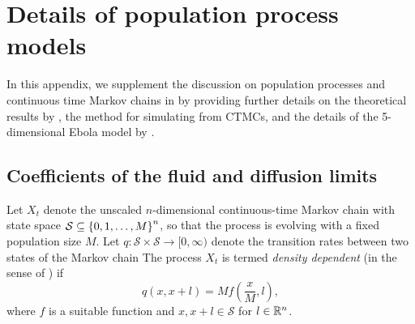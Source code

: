 \chapter{Details of population process models}\label{app:epi}
In this appendix, we supplement the discussion on population processes and continuous time Markov chains in  by providing further details on the theoretical results by \citet{Kurtz_1970_SolutionsOrdinaryDifferential,Kurtz_1971_LimitTheoremsSequences}, the method for simulating from CTMCs, and the details of the 5-dimensional Ebola model by \citet{LegrandEtAl_2007_UnderstandingDynamicsEbola}.

\section{Coefficients of the fluid and diffusion limits}\label{app:epi_kurtz}
Let \(X_t\) denote the unscaled \(n\)-dimensional continuous-time Markov chain with state space \(\mathcal{S} \subseteq \set{0, 1, \dotsc, M}^n\), so that the process is evolving with a fixed population size \(M\).
Let \(q\colon \mathcal{S}\times\mathcal{S} \to [0,\infty)\) denote the transition rates between two states of the Markov chain
The process \(X_t\) is termed \emph{density dependent} (in the sense of \citet{Kurtz_1970_SolutionsOrdinaryDifferential}) if
\begin{equation}
	q\!\left(x, x+l\right) = Mf\!\left(\frac{x}{M}, l\right),
	\label{eqn:ctmc_dens_dep}
\end{equation}
where \(f\) is a suitable function and \(x, x+l \in \mathcal{S}\) for \(l \in \mathbb{R}^n\).
